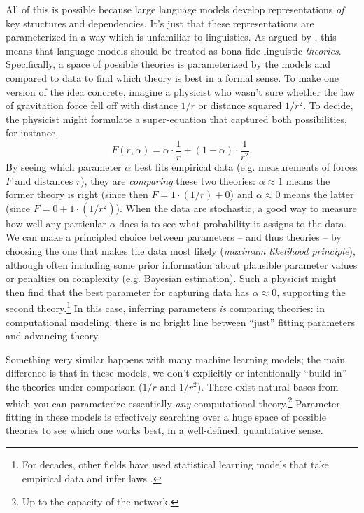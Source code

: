 \documentclass[output=paper,colorlinks,citecolor=brown]{langscibook}
\begin{document}
 
All of this is possible because large language models develop representations \textit{of} key structures and dependencies. It's just that these representations are parameterized in a way which is unfamiliar to linguistics. As argued by \citet{baroni2022proper}, this means that language models should be treated as bona fide linguistic \textit{theories}. Specifically, a space of possible theories is parameterized by the models and compared to data to find which theory is best in a formal sense. To make one version of the idea concrete, imagine a physicist who wasn't sure whether the law of gravitation force fell off with distance $1/r$ or distance squared $1/r^2$. To decide, the physicist might formulate a super-equation that captured both possibilities, for instance,
\[
F(r,\alpha) = \alpha \cdot \frac{1}{r} + (1-\alpha) \cdot \frac{1}{r^2}.
\]
By seeing which parameter $\alpha$ best fits empirical data (e.g. measurements of forces $F$ and distances $r$), they are \textit{comparing} these two theories: $\alpha\approx 1$ means the former theory is right (since then $F=1\cdot (1/r)+0$) and $\alpha \approx 0$ means the latter (since $F=0+1\cdot(1/r^2)$). When the data are stochastic, a good way to measure how well any particular $\alpha$ does is to see what probability it assigns to the data. We can make a principled choice between parameters -- and thus theories -- by choosing the one that makes the data most likely (\textit{maximum likelihood principle}), although often including some prior information about plausible parameter values or penalties on complexity (e.g. Bayesian estimation). 
Such a physicist might then find that the best parameter for capturing data has $\alpha \approx 0$, supporting the second theory.\footnote{For decades, other fields have used statistical learning models that take empirical data and infer laws \citep{koza1994genetic,langley1983rediscovering,schmidt2009distilling,udrescu2020ai}.} In this case, inferring parameters \textit{is} comparing theories: in computational modeling, there is no bright line between ``just'' fitting parameters and advancing theory.\largerpage

Something very similar happens with many machine learning models; the main difference is that in these models, we don't explicitly or intentionally ``build in'' the theories under comparison ($1/r$ and $1/r^2$). There exist natural bases from which you can parameterize essentially \textit{any} computational theory.\footnote{Up to the capacity of the network.} Parameter fitting in these models is effectively searching over a huge space of possible theories to see which one works best, in a well-defined, quantitative sense. 
\end{document}
